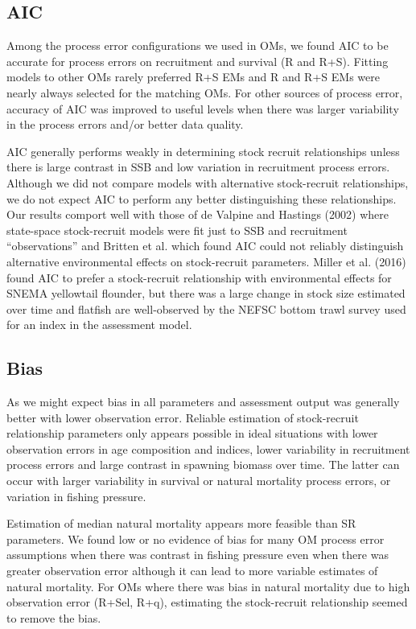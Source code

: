 \documentclass[
  12pt,
]{article}
\begin{document}
\hypertarget{aic}{%
\subsection*{AIC}\label{aic}}

Among the process error configurations we used in OMs, we found AIC to
be accurate for process errors on recruitment and survival (R and R+S).
Fitting models to other OMs rarely preferred R+S EMs and R and R+S EMs
were nearly always selected for the matching OMs. For other sources of
process error, accuracy of AIC was improved to useful levels when there
was larger variability in the process errors and/or better data quality.

AIC generally performs weakly in determining stock recruit relationships
unless there is large contrast in SSB and low variation in recruitment
process errors. Although we did not compare models with alternative
stock-recruit relationships, we do not expect AIC to perform any better
distinguishing these relationships. Our results comport well with those
of de Valpine and Hastings (2002) where state-space stock-recruit models
were fit just to SSB and recruitment ``observations'' and Britten et al.
which found AIC could not reliably distinguish alternative environmental
effects on stock-recruit parameters. Miller et al. (2016) found AIC to
prefer a stock-recruit relationship with environmental effects for SNEMA
yellowtail flounder, but there was a large change in stock size
estimated over time and flatfish are well-observed by the NEFSC bottom
trawl survey used for an index in the assessment model.

\hypertarget{bias-2}{%
\subsection*{Bias}\label{bias-2}}

As we might expect bias in all parameters and assessment output was
generally better with lower observation error. Reliable estimation of
stock-recruit relationship parameters only appears possible in ideal
situations with lower observation errors in age composition and indices,
lower variability in recruitment process errors and large contrast in
spawning biomass over time. The latter can occur with larger variability
in survival or natural mortality process errors, or variation in fishing
pressure.

Estimation of median natural mortality appears more feasible than SR
parameters. We found low or no evidence of bias for many OM process
error assumptions when there was contrast in fishing pressure even when
there was greater observation error although it can lead to more
variable estimates of natural mortality. For OMs where there was bias in
natural mortality due to high observation error (R+Sel, R+q), estimating
the stock-recruit relationship seemed to remove the bias.
\end{document}
